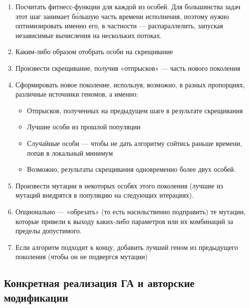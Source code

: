 \begin{enumerate}
    \item Посчитать фитнесс-функции для каждой из особей.
    Для большинства задач этот шаг занимает бо́льшую часть времени исполнения,
    поэтому нужно оптимизировать именно его, в частности — распараллелить,
    запуская независимые вычисления на нескольких потоках.

    \item Каким-либо образом отобрать особи на скрещивание

    \item Произвести скрещивание, получив «отпрысков» — часть нового поколения

    \item Сформировать новое поколение, используя, возможно, в разных пропорциях, различные источники геномов, а именно:

    \begin{itemize}

        \item Отпрысков, полученных на предыдущем шаге в результате скрещивания
        \item Лучшие особи из прошлой популяции

        \item Случайные особи — чтобы не дать алгоритму сойтись раньше времени, попав в локальный минимум

        \item Возможно, результаты скрещивания одновременно более двух особей.

    \end{itemize}

    \item Произвести мутации в некоторых особях этого поколения (лучшие из мутаций внедрятся в популяцию на следующих итерациях).

    \item Опционально — «обрезать» (то есть насильственно подправить)
    те мутации, которые привели к выходу каких-либо параметров или их комбинаций за пределы допустимого.

    \item Если алгоритм подходит к концу, добавить лучший геном из предыдущего поколения (чтобы он не подвергся мутации)

\end{enumerate}

\subsection{Конкретная реализация ГА и авторские модификации}\label{subsec:my_modifications}

